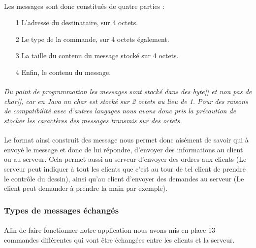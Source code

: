 \documentclass[a4paper,11pt]{article}
\begin{document}
\paragraph{}Les messages sont donc constitués de quatre parties : 
\begin{itemize}
\item[1] L'adresse du destinataire, sur 4 octets.
\item[2] Le type de la commande, sur 4 octets également.
\item[3] La taille du contenu du message stocké sur 4 octets.
\item[4] Enfin, le contenu du message.
\end{itemize}

\paragraph{}\textit{Du point de programmation les messages sont stocké dans des byte[] et non pas de char[], car en Java un char est stocké sur 2 octets au lieu de 1. Pour des raisons de compatibilité avec d'autres langages nous avons donc pris la précaution de stocker les caractères des messages transmis sur des octets.}

\paragraph{}Le format ainsi construit des message nous permet donc aisément de savoir qui à envoyé le message et donc de lui répondre, d'envoyer des informations au client ou au serveur. Cela permet aussi au serveur d'envoyer des ordres aux clients (Le serveur peut indiquer à tout les clients que c'est au tour de tel client de prendre le contrôle du dessin), ainsi qu'au client d'envoyer des demandes au serveur (Le client peut demander à prendre la main par exemple).

\subsubsection{Types de messages échangés}
\paragraph{}Afin de faire fonctionner notre application nous avons mis en place 13 commandes différentes qui vont être échangées entre les clients et la serveur.
\end{document}
